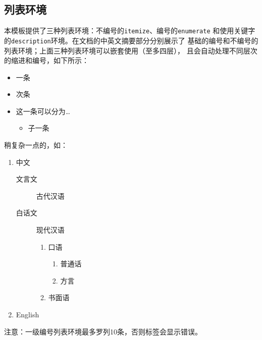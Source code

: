 \subsection{列表环境}\label{subsec:items}
本模板提供了三种列表环境：不编号的\texttt{itemize}、编号的\texttt{enumerate}
和使用关键字的\texttt{description}环境。在文档的中英文摘要部分分别展示了
基础的编号和不编号的列表环境；上面三种列表环境可以嵌套使用（至多四层），
且会自动处理不同层次的缩进和编号，如下所示：
\begin{itemize}
	\item 一条
	\item 次条
	\item 这一条可以分为\dots
			\begin{itemize}
				\item 子一条
			\end{itemize}
\end{itemize}
稍复杂一点的，如：
\begin{enumerate}
	\item 中文
		\begin{description}
			\item[文言文] 古代汉语
			\item[白话文] 现代汉语
				\begin{enumerate}
					\item 口语
						\begin{enumerate}
							\item 普通话
							\item 方言
						\end{enumerate}
					\item 书面语
				\end{enumerate}
		\end{description}
	\item English
\end{enumerate}

注意：一级编号列表环境最多罗列10条，否则标签会显示错误。%
